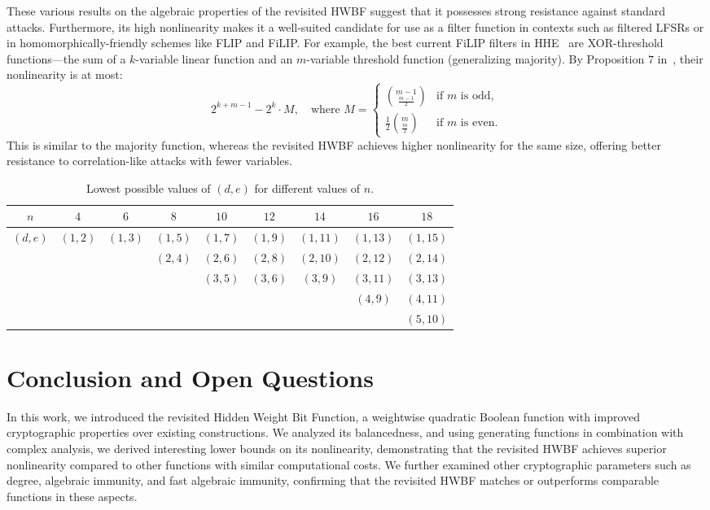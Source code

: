 \documentclass[runningheads,orivec]{llncs}
\newcommand{\hwbf}{\textsf{HWBF}}
\begin{document}
    These various results on the algebraic properties of the revisited \hwbf{} suggest that it possesses strong resistance against standard attacks. Furthermore, its high nonlinearity makes it a well-suited candidate for use as a filter function in contexts such as filtered \textsf{LFSR}s or in homomorphically-friendly schemes like \textsf{FLIP} and \textsf{FiLIP}. For example, the best current \textsf{FiLIP} filters in \textsf{HHE}~\cite{eprint:AGHM24,CCS:CDPP22,CIC:MeaParPei24} are \textsf{XOR}-threshold functions—the sum of a $k$-variable linear function and an $m$-variable threshold function (generalizing majority).  
    By Proposition $7$ in~\cite{IEEE:CarMea21}, their nonlinearity is at most:
    \[
    2^{k+m-1} - 2^k\cdot M, \quad \text{where } M = \begin{cases}
    \binom{m-1}{\frac{m-1}{2}} & \text{if } m \text{ is odd}, \\
    \frac{1}{2} \binom{m}{\frac{m}{2}} & \text{if } m \text{ is even}.
    \end{cases}
    \]
    This is similar to the majority function, whereas the revisited \hwbf{} achieves higher nonlinearity for the same size, offering better resistance to correlation-like attacks with fewer variables.
    \begin{table}
    	\scriptsize
    	\centering
        \caption{Lowest possible values of $(d, e)$ for different values of $n$.}
    	\label{table:FAI}
    	\begin{tabular}{|c|c|c|c|c|c|c|c|c|}
            \hline
            $n$&$4$&$6$&$8$&$10$&$12$&$14$&$16$&$18$\\
            \hline
            $(d,e)$&$(1,2)$&$(1,3)$&$(1,5)$&$(1,7)$&$(1,9)$&$(1,11)$&$(1,13)$&$(1,15)$\\
            &&&$(2,4)$&$(2,6)$&$(2,8)$&$(2,10)$&$(2,12)$&$(2,14)$\\
            &&&&$(3,5)$&$(3,6)$&$(3,9)$&$(3,11)$&$(3,13)$\\
            &&&&&&&$(4,9)$&$(4,11)$\\
            &&&&&&&&$(5,10)$\\
            \hline
    	\end{tabular}
    \end{table}
    
    \section{Conclusion and Open Questions}
    
    In this work, we introduced the revisited Hidden Weight Bit Function, a weightwise quadratic Boolean function with improved cryptographic properties over existing constructions. We analyzed its balancedness, and using generating functions in combination with complex analysis, we derived interesting lower bounds on its nonlinearity, demonstrating that the revisited \hwbf{} achieves superior nonlinearity compared to other functions with similar computational costs. We further examined other cryptographic parameters such as degree, algebraic immunity, and fast algebraic immunity, confirming that the revisited \hwbf{} matches or outperforms comparable functions in these aspects.
    
\end{document}
